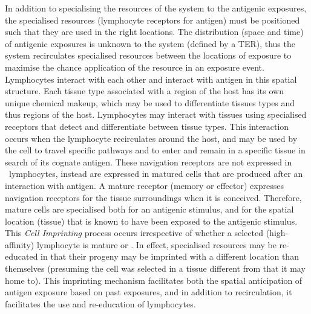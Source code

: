 In addition to specialising the resources of the system to the antigenic exposures, the specialised resources (lymphocyte receptors for antigen) must be positioned such that they are used in the right locations. The distribution (space and time) of antigenic exposures is unknown to the system (defined by a TER), thus the system recirculates specialised resources between the locations of exposure to maximise the chance application of the resource in an exposure event. Lymphocytes interact with each other and interact with antigen in this spatial structure. Each tissue type associated with a region of the host has its own unique chemical makeup, which may be used to differentiate tissues types and thus regions of the host. Lymphocytes may interact with tissues using specialised receptors that detect and differentiate between tissue types. This interaction occurs when the lymphocyte recirculates around the host, and may be used by the cell to travel specific pathways and to enter and remain in a specific tissue in search of its cognate antigen. These navigation receptors are not expressed in \naive\ lymphocytes, instead are expressed in matured cells that are produced after an interaction with antigen. A mature receptor (memory or effector) expresses navigation receptors for the tissue surroundings when it is conceived. Therefore, mature cells are specialised both for an antigenic stimulus, and for the spatial location (tissue) that is known to have been exposed to the antigenic stimulus. This \emph{Cell Imprinting} process occurs irrespective of whether a selected (high-affinity) lymphocyte is mature or \naive. In effect, specialised resources may be re-educated in that their progeny may be imprinted with a different location than themselves (presuming the cell was selected in a tissue different from that it may home to). This imprinting mechanism facilitates both the spatial anticipation of antigen exposure based on past exposures, and in addition to recirculation, it facilitates the use and re-education of lymphocytes. 

